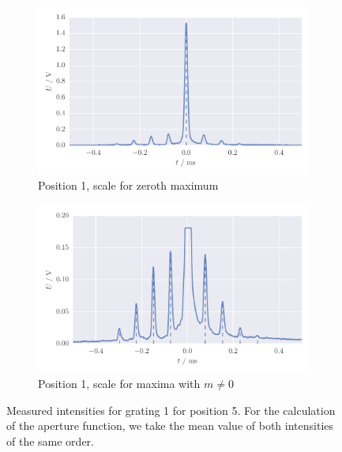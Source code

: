 \begin{figure}
    \centering
    \begin{subfigure}[b]{\pltw}
        \includegraphics[width=\textwidth]{figures/aperture_5a}
        \caption{Position 1, scale for zeroth maximum}
        \label{}
    \end{subfigure}\quad
    \begin{subfigure}[b]{\pltw}
        \includegraphics[width=\textwidth]{figures/aperture_5b}
        \caption{Position 1, scale for maxima with $m \neq 0$}
        \label{}
    \end{subfigure}
    \caption{
        Measured intensities for grating 1 for position 5. 
        For the calculation of the aperture function, 
        we take the mean value of both intensities of the same order. 
        }
    \label{fig:aperture_positions_detail}
\end{figure}
